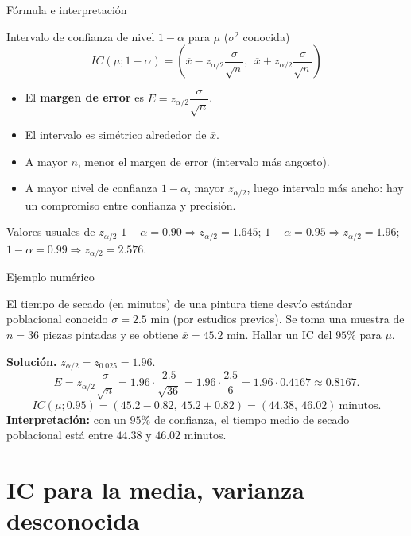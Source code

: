 \documentclass[aspectratio=169,11pt]{beamer}
\begin{document}
\begin{frame}{Fórmula e interpretación}
\begin{alertblock}{Intervalo de confianza de nivel $1-\alpha$ para $\mu$ ($\sigma^2$ conocida)}
\[
IC(\mu; 1-\alpha) = \left(\overline x - z_{\alpha/2}\frac{\sigma}{\sqrt n},\ \ \overline x + z_{\alpha/2}\frac{\sigma}{\sqrt n}\right)
\]
\end{alertblock}

\begin{itemize}
\item El \textbf{margen de error} es $E = z_{\alpha/2}\dfrac{\sigma}{\sqrt n}$.
\item El intervalo es simétrico alrededor de $\overline x$.
\item A mayor $n$, menor el margen de error (intervalo más angosto).
\item A mayor nivel de confianza $1-\alpha$, mayor $z_{\alpha/2}$, luego intervalo más ancho: hay un compromiso entre confianza y precisión.
\end{itemize}

\begin{block}{Valores usuales de $z_{\alpha/2}$}
$1-\alpha=0.90 \Rightarrow z_{\alpha/2}=1.645$; \quad $1-\alpha=0.95 \Rightarrow z_{\alpha/2}=1.96$; \quad $1-\alpha=0.99 \Rightarrow z_{\alpha/2}=2.576$.
\end{block}
\end{frame}

\begin{frame}{Ejemplo numérico}
\begin{example}
El tiempo de secado (en minutos) de una pintura tiene desvío estándar poblacional conocido $\sigma = 2.5$ min (por estudios previos). Se toma una muestra de $n=36$ piezas pintadas y se obtiene $\overline x = 45.2$ min. Hallar un IC del $95\%$ para $\mu$.

\textbf{Solución.} $z_{\alpha/2}=z_{0.025}=1.96$.
\[
E = z_{\alpha/2}\frac{\sigma}{\sqrt n} = 1.96\cdot\frac{2.5}{\sqrt{36}} = 1.96\cdot\frac{2.5}{6} = 1.96\cdot 0.4167 \approx 0.8167.
\]
\[
IC(\mu;0.95) = (45.2 - 0.82,\ 45.2+0.82) = (44.38,\ 46.02)\ \text{minutos}.
\]
\textbf{Interpretación:} con un $95\%$ de confianza, el tiempo medio de secado poblacional está entre $44.38$ y $46.02$ minutos.
\end{example}
\end{frame}

\section{IC para la media, varianza desconocida}
\end{document}
